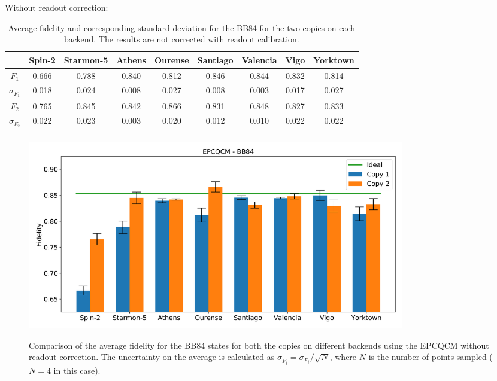 Without readout correction:
\begin{table}[H]
    \centering
    \begin{tabular}{|c|c|c|c|c|c|c|c|c|}
    \hline
    \textbf{} & \textbf{Spin-2} & \textbf{Starmon-5} & \textbf{Athens} & \textbf{Ourense} & \textbf{Santiago} & \textbf{Valencia} & \textbf{Vigo} & \textbf{Yorktown} \\ \hline
    $F_1$              & 0.666  & 0.788 & 0.840 & 0.812 & 0.846 & 0.844 & 0.832 & 0.814 \\ \hline
    $\sigma_{F_1}$     & 0.018  & 0.024 & 0.008 & 0.027 & 0.008 & 0.003 & 0.017 & 0.027 \\ \hline
    $F_2$              & 0.765  & 0.845 & 0.842 & 0.866 & 0.831 & 0.848 & 0.827 & 0.833 \\ \hline
    $\sigma_{F_2}$     & 0.022  & 0.023 & 0.003 & 0.020 & 0.012 & 0.010 & 0.022 & 0.022 \\ \hline
    \caption{Average fidelity and corresponding standard deviation for the BB84 for the two copies on each backend. The results are not corrected with readout calibration.}
    \end{tabular}
\end{table}
\begin{figure}[H]
  \centering
          \includegraphics[width=0.8\textwidth]{Figures/Economical/Histograms/histo_bb84.png}
      \label{fig:epc_histo_bb84_not_corrected}
      \caption{Comparison of the average fidelity for the BB84 states for both the copies on different backends using the EPCQCM without readout correction. The uncertainty on the average is calculated as $\sigma_{\overline{F}_i}=\sigma_{F_i}/\sqrt{N}$, where $N$ is the number of points sampled ($N=4$ in this case).}
\end{figure}
